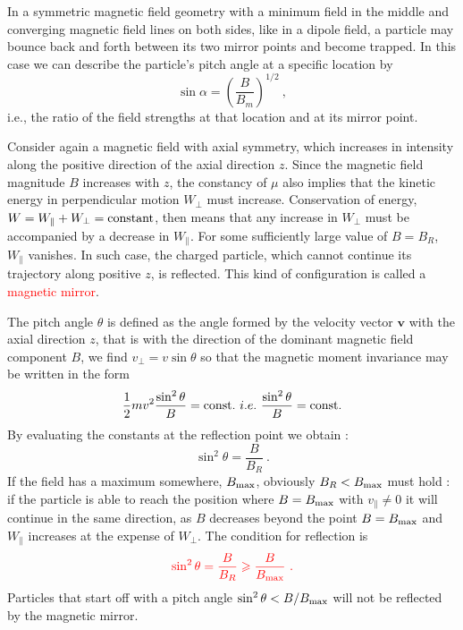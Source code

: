 \documentclass[12pt,a4paper]{article}
\renewcommand{\vec}[1]{\boldsymbol{#1}}
\begin{document}
In a symmetric magnetic field geometry with a minimum field in the middle and converging magnetic field lines on both sides, like in a dipole field, a particle may bounce back and forth between its two mirror points and become trapped. In this case we can describe the particle's pitch angle at a specific location by
\begin{equation}
\sin \alpha = \left(\dfrac{B}{B_m} \right)^{1/2} ~,
\end{equation}
i.e., the ratio of the field strengths at that location and at its mirror point.

\cite{2015bps..book.....C} Consider again a magnetic field with axial symmetry, which increases in intensity along the positive direction of the axial direction $z$. Since the magnetic field magnitude $B$ increases with $z$, the constancy of $\mu$ also implies that the kinetic energy in perpendicular motion $W_\perp$ must increase. Conservation of energy, $W = W_\parallel + W_\perp = {\rm constant}$, then means that any increase in $W_\perp$ must be accompanied by a decrease in $W_\parallel$. For some sufficiently large value of $B = B_R$, $W_\parallel$ vanishes. In such case, the charged particle, which cannot continue its trajectory along positive $z$, is reflected. This kind of configuration is called a \textcolor{red}{magnetic mirror}.

The pitch angle $\theta$ is defined as the angle formed by the velocity vector $\vec{v}$ with the axial direction $z$, that is with the direction of the dominant magnetic field component $B$, we find $v_\perp = v \sin \theta$ so that the magnetic moment invariance may be written in the form
\begin{equation*}
\frac{1}{2} mv^2 \frac{\sin^2 \theta}{B} = {\rm const.} ~i.e. ~ \frac{\sin^2 \theta}{B} = {\rm const.}
\end{equation*}
By evaluating the constants at the reflection point we obtain :
\begin{equation}
\sin^2 \theta = \frac{B}{B_R} ~.
\end{equation}
If the field has a maximum somewhere, $B_{\rm max}$, obviously $B_R < B_{\rm max}$ must hold : if the particle is able to reach the position where $B = B_{\rm max}$ with $v_\parallel \neq 0$ it will continue in the same direction, as $B$ decreases beyond the point $B = B_{\rm max}$ and $W_\parallel$ increases at the expense of $W_\perp$. The condition for reflection is
\begin{equation*}
\color{red} \sin^2 \theta = \frac{B}{B_R} \geqslant \frac{B}{B_{\rm max} } ~.
\end{equation*}
Particles that start off with a pitch angle $\sin^2 \theta < B/B_{\rm max}$ will not be reflected by the magnetic mirror.
\end{document}
